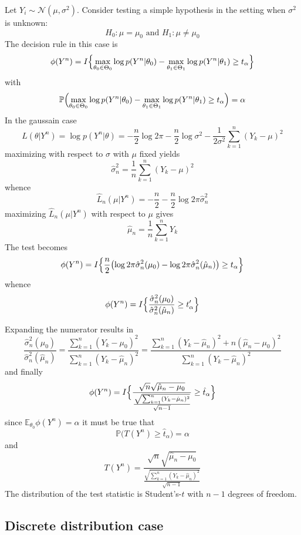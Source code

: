 \documentclass[a4paper]{article}
\newcommand{\Ncal}{\mathcal{N}}
\newcommand{\ex}{\mathbb{E}}
\newcommand{\pr}{\mathbb{P}}
\begin{document}
Let $Y_i\sim \Ncal(\mu, \sigma^2)$. Consider testing a simple hypothesis in the
setting when $\sigma^2$ is unknown:
\[H_0: \mu=\mu_0\text{ and }H_1: \mu\neq \mu_0\]
The decision rule in this case is
\[
\phi(Y^n) = I\Bigl\{ 
\max_{\theta_0\in \Theta_0} \log p(Y^n|\theta_0) - \max_{\theta_1\in \Theta_1} \log p(Y^n|\theta_1) \geq t_\alpha
\Bigr\}
\]
with 
\[
\pr\Bigl( \max_{\theta_0\in \Theta_0} \log p(Y^n|\theta_0) - \max_{\theta_1\in \Theta_1} \log p(Y^n|\theta_1) \geq t_\alpha \Bigr) = \alpha
\]
In the gaussain case 
\[
L(\theta|Y^n)
= \log p(Y^n|\theta)
= - \frac{n}{2} \log 2\pi
  - \frac{n}{2} \log \sigma^2
  - \frac{1}{2\sigma^2} \sum_{k=1}^n (Y_k - \mu)^2
\]
maximizing with respect to $\sigma$ with $\mu$ fixed yields
\[\hat{\sigma}^2_n = \frac{1}{n} \sum_{k=1}^n (Y_k - \mu)^2\]
whence
\[ \hat{L}_n(\mu|Y^n) = - \frac{n}{2} - \frac{n}{2} \log 2\pi \hat{\sigma}^2_n \]
maximizing $\hat{L}_n(\mu|Y^n)$ with respect to $\mu$ gives
\[
\hat{\mu}_n
= \frac{1}{n}\sum_{k=1}^n Y_k
\]
The test becomes
\[
\phi(Y^n)
 = I\Bigl\{ 
\frac{n}{2} \bigl( \log 2\pi \hat{\sigma}^2_n(\mu_0) 
 - \log 2\pi \hat{\sigma}^2_n(\hat{\mu}_n) \bigr)
\geq t_\alpha
\Bigr\}
\]
whence
\[
\phi(Y^n)
 = I\Bigl\{ 
\frac{\hat{\sigma}^2_n(\mu_0)}{\hat{\sigma}^2_n(\hat{\mu}_n)}
\geq t_\alpha'
\Bigr\}
\]

Expanding the numerator results in
\[
\frac{\hat{\sigma}^2_n(\mu_0)}{\hat{\sigma}^2_n(\hat{\mu}_n)}
= \frac{\sum_{k=1}^n (Y_k - \mu_0)^2}{\sum_{k=1}^n (Y_k - \hat{\mu}_n)^2}
= \frac{\sum_{k=1}^n (Y_k - \hat{\mu}_n)^2 + n( \hat{\mu}_n -\mu_0 )^2}{\sum_{k=1}^n (Y_k - \hat{\mu}_n)^2}
\]
and finally 
\[
\phi(Y^n)
 = I\Bigl\{ 
\frac{\sqrt{n} \sqrt{\hat{\mu}_n -\mu_0} }{\frac{\sqrt{\sum_{k=1}^n (Y_k - \hat{\mu}_n)^2}}{\sqrt{n-1}} }
\geq \hat{t}_\alpha
\Bigr\}
\]
since $\ex_{\theta_0}\phi(Y^n) = \alpha$ it must be true that
\[\pr\bigl(T(Y^n) \geq \hat{t}_\alpha\bigr) = \alpha\]
and 
\[
T(Y^n)
= \frac{\sqrt{n} \sqrt{\hat{\mu}_n -\mu_0} }{\frac{\sqrt{\sum_{k=1}^n (Y_k - \hat{\mu}_n)^2}}{\sqrt{n-1}} }
\]
The distribution of the test statistic is Student's-$t$ with $n-1$ degrees of freedom.


\subsection{Discrete distribution case} %
\label{sub:discrete_distribution_case}
\end{document}
